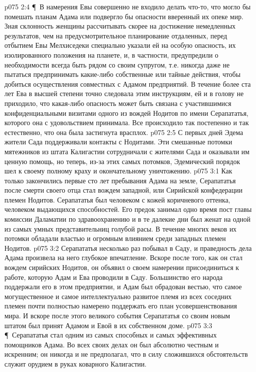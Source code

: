 \vs p075 2:4 \P\ В намерения Евы совершенно не входило делать что\hyp{}то, что могло бы помешать планам Адама или подвергло бы опасности вверенный их опеке мир. Зная склонность женщины рассчитывать скорее на достижение немедленных результатов, чем на предусмотрительное планирование отдаленных, перед отбытием Евы Мелхиседеки специально указали ей на особую опасность, их изолированного положения на планете, и, в частности, предупредили о необходимости всегда быть рядом со своим супругом, т.е. никогда даже не пытаться предпринимать какие\hyp{}либо собственные или тайные действия, чтобы добиться осуществления совместных с Адамом предприятий. В течение более ста лет Ева в высшей степени точно следовала этим инструкциям, ей и в голову не приходило, что какая\hyp{}либо опасность может быть связана с участившимися конфиденциальными визитами одного из вождей Нодитов по имени Серапататья, которого она с удовольствием принимала. Все происходило так постепенно и так естественно, что она была застигнута врасплох.
\vs p075 2:5 С первых дней Эдема жители Сада поддерживали контакты с Нодитами. Эти смешанные потомки мятежников из штата Калигастии сотрудничали с жителями Сада и оказывали им ценную помощь, но теперь, из\hyp{}за этих самых потомков, Эдемический порядок шел к своему полному краху и окончательному уничтожению.
\vs p075 3:1 Как только закончились первые сто лет пребывания Адама на земле, Серапататья после смерти своего отца стал вождем западной, или Сирийской конфедерации племен Нодитов. Серапататья был человеком с кожей коричневого оттенка, человеком выдающихся способностей. Его предок занимал одно время пост главы комиссии Даламатии по здравоохранению и в те далекие дни был женат на одной из самых умных представительниц голубой расы. В течение многих веков их потомки обладали властью и огромным влиянием среди западных племен Нодитов.
\vs p075 3:2 Серапататья несколько раз побывал в Саду, и праведность дела Адама произвела на него глубокое впечатление. Вскоре после того, как он стал вождем сирийских Нодитов, он объявил о своем намерении присоединиться к работе, которую Адам и Ева проводили в Саду. Большинство его народа поддержали его в этом предприятии, и Адам был обрадован вестью, что самое могущественное и самое интеллектуально развитое племя из всех соседних племен почти полностью намерено поддержать его план усовершенствования мира. И вскоре после этого великого события Серапататья со своим новым штатом был принят Адамом и Евой в их собственном доме.
\vs p075 3:3 \P\ Серапататья стал одним из самых способных и самых эффективных помощников Адама. Во всех своих делах он был абсолютно честным и искренним; он никогда и не предполагал, что в силу сложившихся обстоятельств служит орудием в руках коварного Калигастии.
